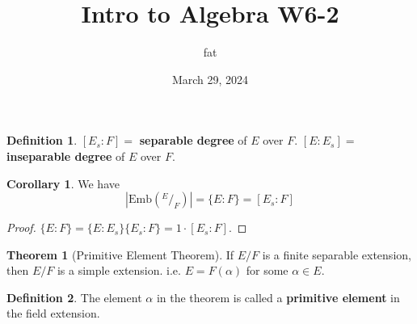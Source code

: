 \documentclass{article}
\title{Intro to Algebra W6-2}
\author{fat}
\date{March 29, 2024}
\theoremstyle{definition}
\newtheorem{thm}{Theorem}
\newtheorem{dfn}{Definition}
\newtheorem{cor}{Corollary}
\newcommand*\quot[2]{{^{\textstyle #1}\big/_{\textstyle #2}}}
\begin{document}
\maketitle
\thispagestyle{fancy}
\renewcommand{\footrulewidth}{0.4pt}
\cfoot{\thepage}
\renewcommand{\headrulewidth}{0.4pt}

\begin{dfn}
	$[E_s:F] = $ \textbf{separable degree} of $E$ over $F$.
	$[E:E_s] = $ \textbf{inseparable degree} of $E$ over $F$.
\end{dfn}

\begin{cor}
	We have
	\[
		\left|\text{Emb}(\quot{E}{F})\right| = \{E:F\} = [E_s:F]
	\]
\end{cor}

\begin{proof}
	$\{E:F\} = \{E:E_s\}\{E_s:F\} = 1 \cdot [E_s:F]$.
\end{proof}

\begin{thm}[Primitive Element Theorem]
	If $E/F$ is a finite separable extension, then $E/F$ is a simple extension.	
	i.e. $E = F(\alpha)$ for some $\alpha \in E$.
\end{thm}

\begin{dfn}
	The element $\alpha$ in the theorem is called a \textbf{primitive element} in the field extension.
\end{dfn}
\end{document}
